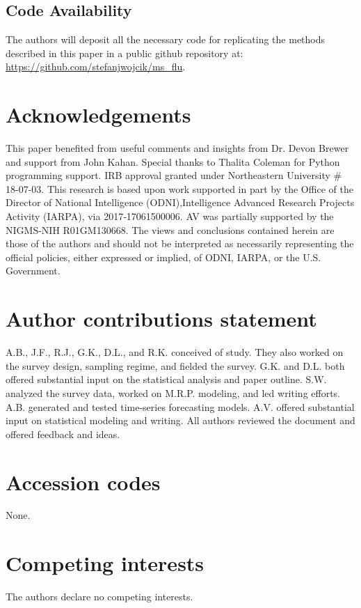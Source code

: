 \documentclass[fleqn,10pt]{wlscirep}
\begin{document}
\subsection*{Code Availability}

The authors will deposit all the necessary code for replicating the methods described in this paper in a public github repository at: \url{https://github.com/stefanjwojcik/ms_flu}.






\section*{Acknowledgements}

This paper benefited from useful comments and insights from Dr. Devon Brewer and support from John Kahan. Special thanks to Thalita Coleman for Python programming support. IRB approval granted under Northeastern University \# 18-07-03. This research is based upon work supported in part by the Office of the Director of National Intelligence (ODNI),Intelligence Advanced Research Projects Activity (IARPA), via 2017‐17061500006. AV was partially supported by the NIGMS-NIH R01GM130668. The views and conclusions contained herein are those of the authors and should not be interpreted as necessarily representing the official policies, either expressed or implied, of ODNI, IARPA, or the U.S. Government.

\section*{Author contributions statement}

A.B., J.F., R.J., G.K., D.L., and R.K. conceived of study. They also worked on the survey design, sampling regime, and fielded the survey. G.K. and D.L. both offered substantial input on the statistical analysis and paper outline. S.W. analyzed the survey data, worked on M.R.P. modeling, and led writing efforts. A.B. generated and tested time-series forecasting models. A.V. offered substantial input on statistical modeling and writing. All authors reviewed the document and offered feedback and ideas. 

\section*{Accession codes}
None.

\section*{Competing interests}

The authors declare no competing interests. 
\end{document}

